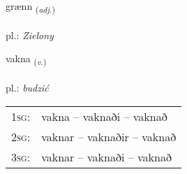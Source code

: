 \documentclass[frontgrid, backgrid]{flacards}\usepackage[]{graphicx}\usepackage[]{xcolor}
\begin{document}
\renewcommand{\blhead}{\vskip5pt {\small\bfseries\footnotesize Lýsingarorð | Adjective }}
\renewcommand{\bcfoot}{\vskip5pt \hspace{2pt}{\small\bfseries\footnotesize 2K}}


{grænn \small{\textsubscript{(\textit{adj.})}} \\[1ex] %
\textphonetic{[kraitn̥]} \\
pl.: \emph{Zielony} \\  [2ex]
\renewcommand*{\arraystretch}{0.8}
}

\renewcommand{\flhead}{\vskip5pt \fboxsep=0pt {\small\bfseries\footnotesize Sagnorð | Verb}}
\renewcommand{\fcfoot}{\vskip5pt \fboxsep=0pt \hspace{2pt}{\small\bfseries\footnotesize 2K}}

\renewcommand{\blhead}{\vskip5pt {\small\bfseries\footnotesize Sagnorð | Verb }}
\renewcommand{\bcfoot}{\vskip5pt \hspace{2pt}{\small\bfseries\footnotesize 2K}}


{vakna \small{\textsubscript{(\textit{v.})}} \\[1ex] %
\textphonetic{[vahkna]} \\
pl.: \emph{budzić} \\  [2ex]
\renewcommand*{\arraystretch}{0.8}
\begin{tabular}{p{1cm}l}
\textsc{1sg}: & vakna -- vaknaði -- vaknað \\ 
\textsc{2sg}: & vaknar -- vaknaðir -- vaknað \\ 
\textsc{3sg}: & vaknar -- vaknaði -- vaknað \\ 
\end{tabular}
}
\end{document}
